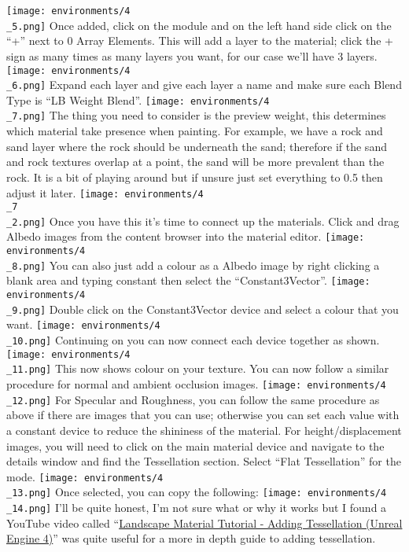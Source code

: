 \documentclass[../main.tex]{subfiles}
\begin{document}
\texttt{[image: environments/4\\\_5.png]}
Once added, click on the module and on the left hand side click on the “+” next to 0 Array Elements. This will add a layer to the material; click the + sign as many times as many layers you want, for our case we’ll have 3 layers.
\texttt{[image: environments/4\\\_6.png]}
Expand each layer and give each layer a name and make sure each Blend Type is “LB Weight Blend”.
\texttt{[image: environments/4\\\_7.png]}
The thing you need to consider is the preview weight, this determines which material take presence when painting. For example, we have a rock and sand layer where the rock should be underneath the sand; therefore if the sand and rock textures overlap at a point, the sand will be more prevalent than the rock.
It is a bit of playing around but if unsure just set everything to 0.5 then adjust it later.
\texttt{[image: environments/4\\\_7\\\_2.png]}
Once you have this it’s time to connect up the materials.
Click and drag Albedo images from the content browser into the material editor.
\texttt{[image: environments/4\\\_8.png]}
You can also just add a colour as a Albedo image by right clicking a blank area and typing constant then select the “Constant3Vector”.
\texttt{[image: environments/4\\\_9.png]}
Double click on the Constant3Vector device and select a colour that you want.
\texttt{[image: environments/4\\\_10.png]}
Continuing on you can now connect each device together as shown.
\texttt{[image: environments/4\\\_11.png]}
This now shows colour on your texture. You can now follow a similar procedure for normal and ambient occlusion images.
\texttt{[image: environments/4\\\_12.png]}
For Specular and Roughness, you can follow the same procedure as above if there are images that you can use; otherwise you can set each value with a constant device to reduce the shininess of the material.
For height/displacement images, you will need to click on the main material device and navigate to the details window and find the Tessellation section. Select “Flat Tessellation” for the mode.
 \texttt{[image: environments/4\\\_13.png]}
Once selected, you can copy the following:
\texttt{[image: environments/4\\\_14.png]}
I’ll be quite honest, I’m not sure what or why it works but I found a YouTube video called “\href{https://www.youtube.com/watch?v=W1MRDXUWID4}{Landscape Material Tutorial - Adding Tessellation (Unreal Engine 4)}” was quite useful for a more in depth guide to adding tessellation.
\end{document}

